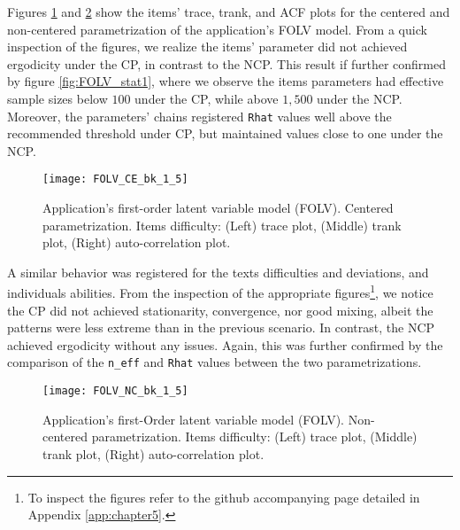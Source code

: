 Figures \ref{fig:FOLV_CE_chains1} and \ref{fig:FOLV_NC_chains1} show the items' trace, trank, and ACF plots for the centered and non-centered parametrization of the application's FOLV model. From a quick inspection of the figures, we realize the items' parameter did not achieved ergodicity under the CP, in contrast to the NCP. This result if further confirmed by figure \ref{fig:FOLV_stat1}, where we observe the items parameters had effective sample sizes below $100$ under the CP, while above $1,500$ under the NCP. Moreover, the parameters' chains registered \texttt{Rhat} values well above the recommended threshold under CP, but maintained values close to one under the NCP.
%
\begin{figure}[H]
	\centering
	\texttt{[image: FOLV\_CE\_bk\_1\_5]}
	\caption[Application's first-order latent variable model (FOLV). Centered parametrization. Items difficulty. Trace, trank and auto-correlation plots.]%
	{Application's first-order latent variable model (FOLV). Centered parametrization. Items difficulty: (Left) trace plot, (Middle) trank plot, (Right) auto-correlation plot.}
	\label{fig:FOLV_CE_chains1}
\end{figure}

A similar behavior was registered for the texts difficulties and deviations, and individuals abilities. From the inspection of the appropriate figures\footnote{To inspect the figures refer to the github accompanying page detailed in Appendix \ref{app:chapter5}.}, we notice the CP did not achieved stationarity, convergence, nor good mixing, albeit the patterns were less extreme than in the previous scenario. In contrast, the NCP achieved ergodicity without any issues. Again, this was further confirmed by the comparison of the \texttt{n\_eff} and \texttt{Rhat} values between the two parametrizations.
%
\begin{figure}[H]
	\centering
	\texttt{[image: FOLV\_NC\_bk\_1\_5]}
	\caption[Application's first-order latent variable model (FOLV). Non-centered parametrization. Items difficulty. Trace, trank and auto-correlation plots.]%
	{Application's first-Order latent variable model (FOLV). Non-centered parametrization. Items difficulty: (Left) trace plot, (Middle) trank plot, (Right) auto-correlation plot.}
	\label{fig:FOLV_NC_chains1}
\end{figure}

